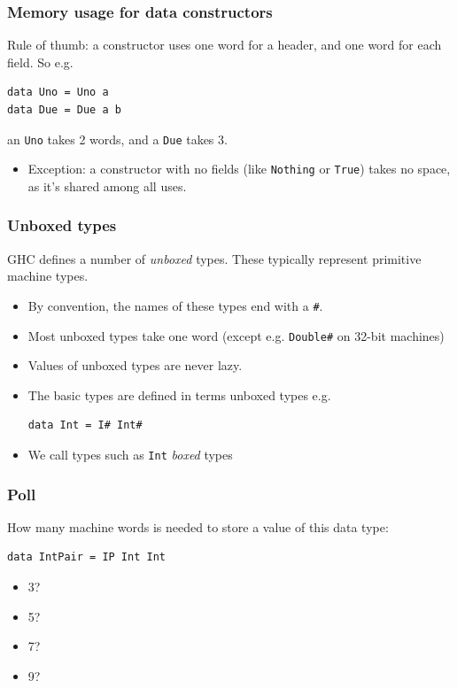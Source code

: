 \documentclass{beamer}
\begin{document}
\begin{frame}[fragile]
  \frametitle{Memory usage for data constructors}

  Rule of thumb: a constructor uses one word for a header, and one
  word for each field.  So e.g.
\begin{lstlisting}
data Uno = Uno a
data Due = Due a b
\end{lstlisting}

  an \lstinline!Uno! takes 2 words, and a \lstinline!Due! takes 3.

  \begin{itemize}
  \item Exception: a constructor with no fields (like
    \lstinline!Nothing! or \lstinline!True!) takes no space, as it's
    shared among all uses.
  \end{itemize}
\end{frame}

\begin{frame}[fragile]
  \frametitle{Unboxed types}

  GHC defines a number of \emph{unboxed} types.  These typically
  represent primitive machine types.

  \begin{itemize}
  \item By convention, the names of these types end with a
    \lstinline!#!.
  \item Most unboxed types take one word (except
    e.g. \lstinline!Double#! on 32-bit machines)
  \item Values of unboxed types are never lazy.
  \item The basic types are defined in terms unboxed types e.g.
  \begin{lstlisting}
data Int = I# Int#
  \end{lstlisting}
  \item We call types such as \lstinline!Int! \emph{boxed} types
  \end{itemize}
\end{frame}

\begin{frame}[fragile]
  \frametitle{Poll}

  How many machine words is needed to store a value of this data type:

\begin{lstlisting}
data IntPair = IP Int Int
\end{lstlisting}

  \begin{itemize}
  \item 3?
  \item 5?
  \item 7?
  \item 9?
  \end{itemize}
\end{frame}
\end{document}
